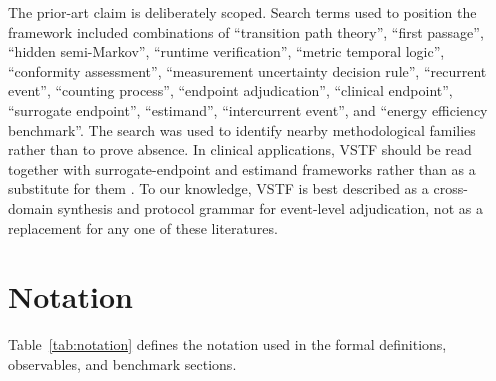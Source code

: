 \documentclass[11pt,a4paper]{article}
\newcommand{\1}{\mathbf{1}}
\begin{document}
The prior-art claim is deliberately scoped. Search terms used to position the framework included combinations of ``transition path theory'', ``first passage'', ``hidden semi-Markov'', ``runtime verification'', ``metric temporal logic'', ``conformity assessment'', ``measurement uncertainty decision rule'', ``recurrent event'', ``counting process'', ``endpoint adjudication'', ``clinical endpoint'', ``surrogate endpoint'', ``estimand'', ``intercurrent event'', and ``energy efficiency benchmark''. The search was used to identify nearby methodological families rather than to prove absence. In clinical applications, VSTF should be read together with surrogate-endpoint and estimand frameworks rather than as a substitute for them \cite{prentice1989,ich2019e9r1}. To our knowledge, VSTF is best described as a cross-domain synthesis and protocol grammar for event-level adjudication, not as a replacement for any one of these literatures.

\section{Notation}

Table~\ref{tab:notation} defines the notation used in the formal definitions, observables, and benchmark sections.
\end{document}
